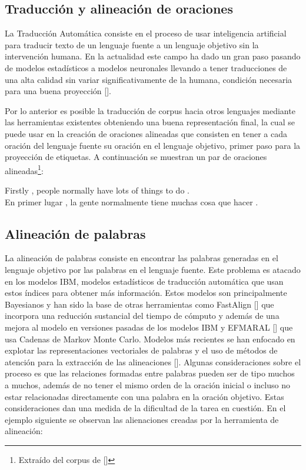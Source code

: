 \subsection{Traducción y alineación de oraciones}

La Traducción Automática consiste en el proceso de usar inteligencia artificial para
traducir texto de un lenguaje fuente a un lenguaje objetivo sin la intervención humana.
En la actualidad este campo ha dado un gran paso pasando de modelos estadísticos a modelos
neuronales llevando a tener traducciones de una alta calidad sin variar significativamente de la humana, 
condición necesaria para una buena proyección [\cite{eger2018cross}].

Por lo anterior es posible la traducción de corpus hacia otros lenguajes mediante las
herramientas existentes obteniendo una buena representación final, la cual se puede usar en la creación de
oraciones alineadas que consisten en tener a cada oración del lenguaje fuente su oración en el 
lenguaje objetivo, primer paso para la proyección de etiquetas. 
A continuación se muestran un par de oraciones alineadas\footnote{Extraído del corpus de [\cite{stab2017parsing}]}:

\begin{adjustwidth}{25pt}{25pt}
	Firstly , people normally have lots of things to do . \\
	En primer lugar , la gente normalmente tiene muchas cosa que hacer .
\end{adjustwidth}

\subsection{Alineación de palabras}

La alineación de palabras consiste en encontrar las palabras generadas en el lenguaje objetivo por las 
palabras en el lenguaje fuente.
Este problema es atacado en los modelos IBM, modelos estadísticos de traducción automática que usan estos 
índices para obtener más información. Estos modelos son principalmente Bayesianos y han sido la base de
otras herramientas como FastAlign [\cite{dyer2013fastalign}] que incorpora una reducción sustancial del
tiempo de cómputo y además de una mejora al modelo en versiones pasadas de los modelos IBM y
EFMARAL [\cite{ostling2016efficient}] que usa
Cadenas de Markov Monte Carlo. Modelos más recientes se han enfocado en explotar las representaciones
vectoriales de palabras y el uso de métodos de atención para la extracción de las
alineaciones [\cite{dou2021word}]. Algunas consideraciones sobre el proceso es que las relaciones 
formadas entre palabras pueden ser de tipo muchos a muchos, además de no tener el mismo orden de la 
oración inicial o incluso no estar relacionadas directamente con una palabra en la oración objetivo.
Estas consideraciones dan una medida de la dificultad de la tarea en cuestión.
En el ejemplo siguiente se observan las alienaciones creadas por la herramienta de alineación:

